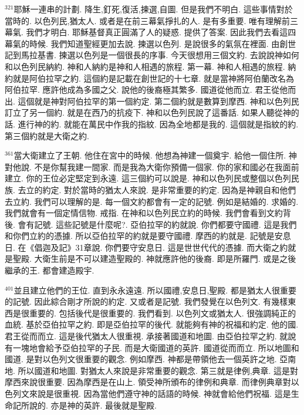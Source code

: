 \documentclass{book}
\begin{document}
$^{321}$耶穌一連串的計劃.
降生,釘死,復活,揀選,自圖.
但是我們不明白.
這些事情對於當時的.
以色列民,猶太人.
或者是在前三幕氣掙扎的人.
是有多重要.
唯有理解前三幕氣.
我們才明白.
耶穌基督真正圓滿了人的疑惑.
提供了答案.
因此我們去看這四幕氣的時候.
我們知道聖經更加去說.
揀選以色列.
是說很多的氣氛在裡面.
由創世記到馬拉基書.
揀選以色列是一個很長的序事.
今天很想用三個文約.
去說說神如何和以色列民納約.
神和人納約是神和人相遇的旅程.
第一幕.
神和人相遇的旅程.
納約就是阿伯拉罕之約.
這個約是記載在創世記的十七章.
就是當神將阿伯蘭改名為阿伯拉罕.
應許他成為多國之父.
說他的後裔極其繁多.
國道從他而立.
君王從他而出.
這個就是神對阿伯拉罕的第一個約定.
第二個約就是數算到摩西.
神和以色列民訂立了另一個約.
就是在西乃的抗疫下.
神和以色列民說了這番話.
如果人聽從神的話.
進行神的約.
就能在萬民中作我的指紋.
因為全地都是我的.
這個就是指紋的約.
第三個約就是大衛之約.

$^{361}$當大衛建立了王朝.
他住在宮中的時候.
他想為神建一個奠宇.
給他一個住所.
神對他說.
不是你幫我建一間家.
而是我為大衛你預備一個家.
你的家和國必在我面前建立.
你的王位必定堅定到永遠.
這三個約可以說是.
神和以色列民或整個以色列民族.
去立的約定.
對於當時的猶太人來說.
是非常重要的約定.
因為是神親自和他們去立約.
我們可以理解的是.
每一個文約都會有一定的記號.
例如是結婚的.
求婚的.
我們就會有一個定情信物.
戒指.
在神和以色列民立約的時候.
我們會看到文約背後.
會有記號.
這些記號是什麼呢?.
亞伯拉罕的約就說.
你們都要守國禮.
這是我們和你們立約的憑據.
所以亞伯拉罕的約就是要守國禮.
摩西的約就是.
記號是安息日.
在《倡迦及記》31章說.
你們要守安息日.
這是世世代代的憑據.
而大衛之約就是聖殿.
大衛生前是不可以建造聖殿的.
神就應許他的後裔.
即是所羅門.
或是之後繼承的王.
都會建造殿宇.

$^{401}$並且建立他們的王位.
直到永永遠遠.
所以國禮,安息日,聖殿.
都是猶太人很重要的記號.
因此綜合剛才所說的約定.
又或者是記號.
我們發覺在以色列文.
有幾樣東西是很重要的.
包括後代是很重要的.
我們看到.
以色列文或猶太人.
很強調純正的血統.
基於亞伯拉罕之約.
即是亞伯拉罕的後代.
就能夠有神的祝福和約定.
他的國.
君王從而而立.
這是後代猶太人很重視.
承接著國道和地圖.
由亞伯拉罕之約.
就說有一塊地會給予亞伯拉罕的子民.
而是大衛國道的英許.
國道從而而立.
所以地圖和國道.
是對以色列文很重要的觀念.
例如摩西.
神都是帶領他去一個英許之地.
亞南地.
所以國道和地圖.
對猶太人來說是非常重要的觀念.
第三就是律例,典章.
這是對摩西來說很重要.
因為摩西是在山上.
領受神所頒布的律例和典章.
而律例典章對以色列文來說是很重視.
因為當他們遵守神的話語的時候.
神就會給他們祝福.
這是生命記所說的.
亦是神的英許.
最後就是聖殿.
\end{document}
